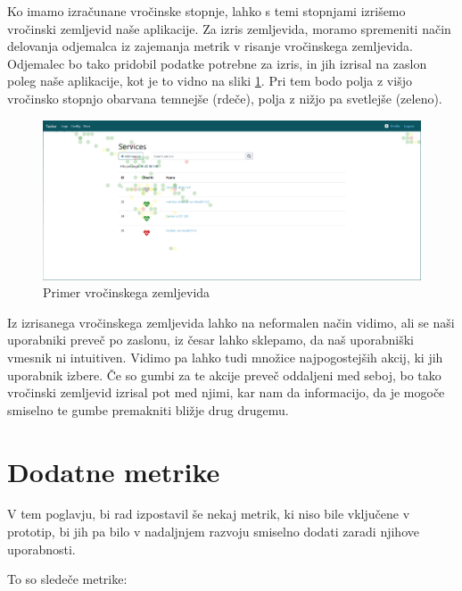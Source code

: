 \documentclass[a4paper, 12pt]{book}
\begin{document}
Ko imamo izračunane vročinske stopnje, lahko s temi stopnjami izrišemo vročinski zemljevid naše aplikacije. Za izris zemljevida, moramo spremeniti način delovanja odjemalca iz zajemanja metrik v risanje vročinskega zemljevida. Odjemalec bo tako pridobil podatke potrebne za izris, in jih izrisal na zaslon poleg naše aplikacije, kot je to vidno na sliki \ref{img:heatmap}. Pri tem bodo polja z višjo vročinsko stopnjo obarvana temnejše (rdeče), polja z nižjo pa svetlejše (zeleno).

\begin{figure}[h]
	\begin{center}
		\includegraphics[width=1\textwidth]{heatmap_1.png}
	\end{center}
	\caption{Primer vročinskega zemljevida}
	\label{img:heatmap}
\end{figure}

Iz izrisanega vročinskega zemljevida lahko na neformalen način vidimo, ali se naši uporabniki preveč  po zaslonu, iz česar lahko sklepamo, da naš uporabniški vmesnik ni intuitiven. Vidimo pa lahko tudi množice najpogostejših akcij, ki jih uporabnik izbere. Če so gumbi za te akcije preveč oddaljeni med seboj, bo tako vročinski zemljevid izrisal pot med njimi, kar nam da informacijo, da je mogoče smiselno te gumbe premakniti bližje drug drugemu.

\section{Dodatne metrike}
\label{ch2:sec5}
V tem poglavju, bi rad izpostavil še nekaj metrik, ki niso bile vključene v prototip, bi jih pa bilo v nadaljnjem razvoju smiselno dodati zaradi njihove uporabnosti.

To so sledeče metrike:
\end{document}
